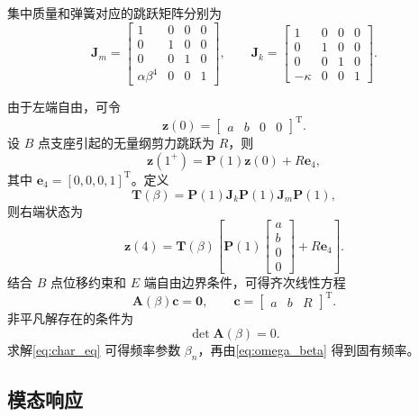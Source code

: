 \documentclass[UTF8,a4paper,zihao=-4]{ctexart}
\begin{document}
集中质量和弹簧对应的跳跃矩阵分别为
\begin{equation}
\bm J_m=
\begin{bmatrix}
1&0&0&0\\
0&1&0&0\\
0&0&1&0\\
\alpha\beta^4&0&0&1
\end{bmatrix},\qquad
\bm J_k=
\begin{bmatrix}
1&0&0&0\\
0&1&0&0\\
0&0&1&0\\
-\kappa&0&0&1
\end{bmatrix}.
\end{equation}

由于左端自由，可令
\begin{equation}
\bm z(0)=
\begin{bmatrix}
a&b&0&0
\end{bmatrix}^{\mathrm T}.
\end{equation}
设 $B$ 点支座引起的无量纲剪力跳跃为 $R$，则
\begin{equation}
\bm z(1^+)=\bm P(1)\bm z(0)+R\bm e_4 ,
\end{equation}
其中 $\bm e_4=[0,0,0,1]^{\mathrm T}$。定义
\begin{equation}
\bm T(\beta)=\bm P(1)\bm J_k\bm P(1)\bm J_m\bm P(1),
\end{equation}
则右端状态为
\begin{equation}
\bm z(4)=\bm T(\beta)\left[\bm P(1)
\begin{bmatrix}
a\\b\\0\\0
\end{bmatrix}
+R\bm e_4\right].
\end{equation}
结合 $B$ 点位移约束和 $E$ 端自由边界条件，可得齐次线性方程
\begin{equation}
\bm A(\beta)\bm c=\bm 0,\qquad
\bm c=
\begin{bmatrix}
a&b&R
\end{bmatrix}^{\mathrm T}.
\end{equation}
非平凡解存在的条件为
\begin{equation}
\det \bm A(\beta)=0 .
\label{eq:char_eq}
\end{equation}
求解\cref{eq:char_eq} 可得频率参数 $\beta_n$，再由\cref{eq:omega_beta} 得到固有频率。

\subsection{模态响应}
\end{document}
